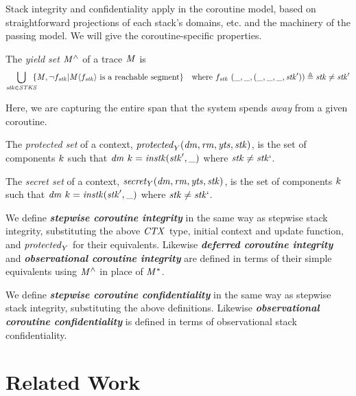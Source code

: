 \documentclass[acmsmall,review,anonymous]{acmart}\settopmatter{printfolios=true,printccs=false,printacmref=false}
\begin{document}
{Stack integrity and confidentiality apply in the coroutine model, based on straightforward
projections of each stack's domains, etc. and the machinery of the passing model. We will give
the coroutine-specific properties.

 The \emph{yield set} \(\mathit{M}^\wedge\) of a trace \(\mathit{M}\)  is
\[\begin{aligned}
\bigcup_{\mathit{stk} \in \mathit{STKS}} \hspace{-.5em} \{\mathit{M}, \neg f_{\mathit{stk}} | \mathit{M}\langle f_{\mathit{stk}} \rangle
\text{ is a reachable segment}\} \hspace{1em} &
\text{where } f_{\mathit{stk}} ~ (\mbox{\_},\mbox{\_},(\mbox{\_},\mbox{\_},\mbox{\_},\mathit{stk}')) \triangleq \mathit{stk} \not = \mathit{stk}' \\
\end{aligned}\]

\noindent
Here, we are capturing the entire span that the system spends {\em away} from a given
coroutine.

The \emph{protected set} of a context, \(\mathit{protected}_Y(\mathit{dm},\mathit{rm},\mathit{yts},\mathit{stk})\),
is the set of components \(k\) such that
\(\mathit{dm} ~ k = \mathit{instk}(\mathit{stk}',\mbox{\_})\) where \(\mathit{stk} \not = \mathit{stk}`\).

The \emph{secret set} of a context, \(\mathit{secret}_Y(\mathit{dm},\mathit{rm},\mathit{yts},\mathit{stk})\),
is the set of components \(k\) such that
\(\mathit{dm} ~ k = \mathit{instk}(\mathit{stk}',\mbox{\_})\) where \(\mathit{stk} \not = \mathit{stk}`\).

We define \textbf{\em stepwise coroutine integrity} in the same way as stepwise stack integrity,
substituting the above \(\mathit{CTX}\) type, initial context and update
function, and \(\mathit{protected}_Y\) for their equivalents. Likewise
\textbf{\em deferred coroutine integrity} and \textbf{\em observational coroutine integrity} are defined
in terms of their simple equivalents using \(\mathit{M}^\wedge\) in place of \(\mathit{M}^*\).

We define \textbf{\em stepwise coroutine confidentiality} in the same way as stepwise stack
integrity, substituting the above definitions. Likewise
\textbf{\em observational coroutine confidentiality} is defined in terms of observational
stack confidentiality.

\section{Related Work}
\label{sec:relwork}

}
\end{document}
